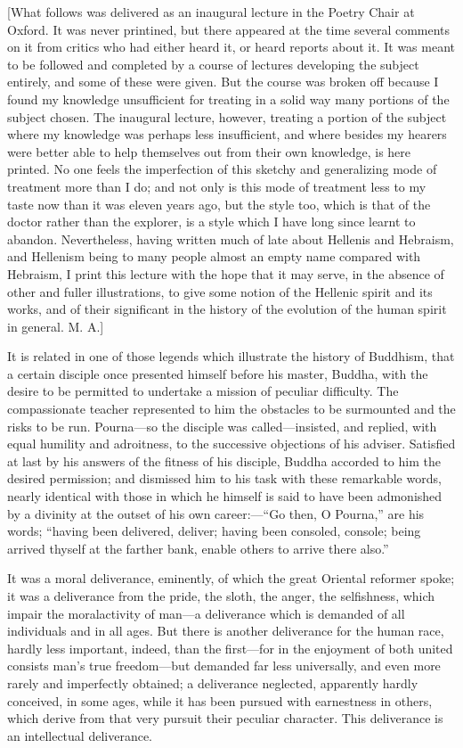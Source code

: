 {[}What follows was delivered as an inaugural lecture in the Poetry
Chair at Oxford. It was never printined, but there appeared at the time
several comments on it from critics who had either heard it, or heard
reports about it. It was meant to be followed and completed by a course
of lectures developing the subject entirely, and some of these were
given. But the course was broken off because I found my knowledge
unsufficient for treating in a solid way many portions of the subject
chosen. The inaugural lecture, however, treating a portion of the
subject where my knowledge was perhaps less insufficient, and where
besides my hearers were better able to help themselves out from their
own knowledge, is here printed. No one feels the imperfection of this
sketchy and generalizing mode of treatment more than I do; and not only
is this mode of treatment less to my taste now than it was eleven years
ago, but the style too, which is that of the doctor rather than the
explorer, is a style which I have long since learnt to abandon.
Nevertheless, having written much of late about Hellenis and Hebraism,
and Hellenism being to many people almost an empty name compared with
Hebraism, I print this lecture with the hope that it may serve, in the
absence of other and fuller illustrations, to give some notion of the
Hellenic spirit and its works, and of their significant in the history
of the evolution of the human spirit in general. M. A.{]}

It is related in one of those legends which illustrate the history of
Buddhism, that a certain disciple once presented himself before his
master, Buddha, with the desire to be permitted to undertake a mission
of peculiar difficulty. The compassionate teacher represented to him the
obstacles to be surmounted and the risks to be run. Pourna---so the
disciple was called---insisted, and replied, with equal humility and
adroitness, to the successive objections of his adviser. Satisfied at
last by his answers of the fitness of his disciple, Buddha accorded to
him the desired permission; and dismissed him to his task with these
remarkable words, nearly identical with those in which he himself is
said to have been admonished by a divinity at the outset of his own
career:---``Go then, O Pourna,'' are his words; ``having been delivered,
deliver; having been consoled, console; being arrived thyself at the
farther bank, enable others to arrive there also.''

It was a moral deliverance, eminently, of which the great Oriental
reformer spoke; it was a deliverance from the pride, the sloth, the
anger, the selfishness, which impair the moralactivity of man---a
deliverance which is demanded of all individuals and in all ages. But
there is another deliverance for the human race, hardly less important,
indeed, than the first---for in the enjoyment of both united consists
man's true freedom---but demanded far less universally, and even more
rarely and imperfectly obtained; a deliverance neglected, apparently
hardly conceived, in some ages, while it has been pursued with
earnestness in others, which derive from that very pursuit their
peculiar character. This deliverance is an intellectual deliverance.

